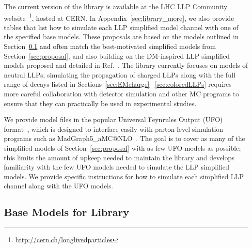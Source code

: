 The current version of the library is available at the LHC LLP Community website~\footnote{\url{http://cern.ch/longlivedparticles}}, hosted at CERN.
In Appendix~\ref{sec:library_more}, we also provide tables that list how to simulate each LLP simplified model channel with one of the specified base models.
These proposals are based on the models outlined in Section~\ref{sec:base} and often match the best-motivated simplified models from Section~\ref{sec:proposal}, and also building on the DM-inspired LLP simplified models proposed and detailed in Ref.~\cite{Buchmueller:2017uqu}.
The library currently focuses on models of neutral LLPs; simulating the propagation of charged LLPs along with the full range of decays listed in Sections~\ref{sec:EMcharge}$-$\ref{sec:coloredLLPs} requires more careful collaboration with detector simulation and other MC programs to ensure that they can practically be used in experimental studies.

We provide model files in the popular Universal Feynrules Output (UFO) format~\cite{Degrande:2011ua}, which is designed to interface easily with parton-level simulation programs such as MadGraph5\_aMC@NLO~\cite{Alwall:2014hca}.
The goal is to cover as many of the simplified models of Section~\ref{sec:proposal} with as few UFO models as possible; this limits the amount of upkeep needed to maintain the library and develops familiarity with the few UFO models needed to simulate the LLP simplified models.
We provide specific instructions for how to simulate each simplified LLP channel along with the UFO models. 

\subsection{Base Models for Library}\label{sec:base}

